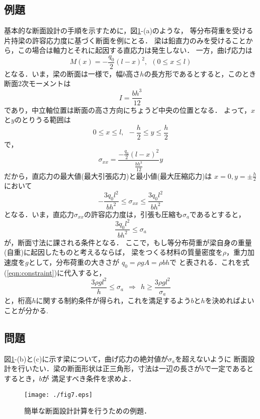 \documentclass[10pt,a4j]{jarticle}
\begin{document}
\subsection{例題}
基本的な断面設計の手順を示すために，図\ref{fig:fig13_7}-(a)のような，
等分布荷重を受ける片持梁の許容応力度に基づく断面を例にとる．
梁は鉛直力のみを受けることから，この場合は軸力とそれに起因する直応力は発生しない．
一方，曲げ応力は
\begin{equation}
	M(x)=-\frac{q_0}{2}(l-x)^2, \ \ (0 \leq x \leq l)  
\end{equation}
となる．いま，梁の断面は一様で，幅$b$高さ$h$の長方形であるとすると，このとき
断面2次モーメントは
\begin{equation}
	I=\frac{bh^3}{12}
\end{equation}
であり，中立軸位置は断面の高さ方向にちょうど中央の位置となる．
よって，$x$と$y$のとりうる範囲は
\begin{equation}
	0 \leq  x \leq l, \ \ 
	-\frac{h}{2} \leq  y \leq \frac{h}{2} 
\end{equation}
で，
\begin{equation}
	\sigma_{xx}=\frac{-\frac{q_0}{2}(l-x)^2}{\frac{bh^3}{12}}y
\end{equation}
だから，直応力の最大値(最大引張応力)と最小値(最大圧縮応力)は
$x=0, y=\pm \frac{h}{2}$において
\begin{equation}
	-\frac{3q_0l^2}{bh^2}
	\leq \sigma_{xx} \leq 
	\frac{3q_0l^2}{bh^2}
\end{equation}
となる．いま，直応力$\sigma_{xx}$の許容応力度は，引張も圧縮も$\sigma_a$であるとすると，
\begin{equation}
	\frac{3q_0l^2}{bh^2} \leq \sigma_a
	\label{eqn:constraint}
\end{equation}
が，断面寸法に課される条件となる．
ここで，もし等分布荷重が梁自身の重量(自重)に起因したものと考えるならば，
梁をつくる材料の質量密度を$\rho$，重力加速度を$g$として，分布荷重の大きさが
$q_0=\rho g A=\rho bh$で
と表される．これを式(\ref{eqn:constraint})に代入すると，
\begin{equation}
	\frac{3\rho g l^2}{h} \leq \sigma_a \ \ 
	\Rightarrow 
	\ \ 
	h \geq \frac{3\rho g l^2}{\sigma_a}
\end{equation}
と，桁高$h$に関する制約条件が得られ，これを満足するよう$b$と$h$を決めればよい
ことが分かる. 
\subsection{問題}
図\ref{fig:fig13_7}-(b)と(c)に示す梁について，曲げ応力の絶対値が$\sigma_a$を超えないように
断面設計を行いたい．梁の断面形状は正三角形，寸法は一辺の長さが$b$で一定であるとするとき，$b$が
満足すべき条件を求めよ．
\begin{figure}[h]
	\begin{center}
	\texttt{[image: ./fig7.eps]} 
	\end{center}
	\caption{
		簡単な断面設計計算を行うための例題．
	} 
	\label{fig:fig13_7}
\end{figure}
\end{document}
